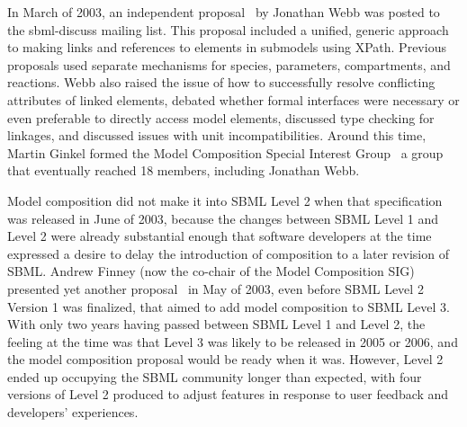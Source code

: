 In March of 2003, an independent proposal~\cite{} by Jonathan Webb was
posted to the sbml-discuss mailing list.  This proposal included a
unified, generic approach to making links and references to elements in
submodels using XPath.  Previous proposals used separate mechanisms for
species, parameters, compartments, and reactions.  Webb also raised the
issue of how to successfully resolve conflicting attributes of linked
elements, debated whether formal interfaces were necessary or even
preferable to directly access model elements, discussed type checking
for linkages, and discussed issues with unit incompatibilities.  Around
this time, Martin Ginkel formed the Model Composition Special Interest
Group~\cite{} a group that eventually reached 18 members, including
Jonathan Webb.

Model composition did not make it into SBML Level 2 when that
specification was released in June of 2003, because the changes between
SBML Level 1 and Level 2 were already substantial enough that software
developers at the time expressed a desire to delay the introduction of
composition to a later revision of SBML.  Andrew Finney (now the
co-chair of the Model Composition SIG) presented yet another
proposal~\cite{} in May of 2003, even before SBML Level 2 Version 1 was
finalized, that aimed to add model composition to SBML Level 3.  With
only two years having passed between SBML Level 1 and Level 2, the
feeling at the time was that Level 3 was likely to be released in 2005
or 2006, and the model composition proposal would be ready when it was.
However, Level 2 ended up occupying the SBML community longer than
expected, with four versions of Level 2 produced to adjust features in
response to user feedback and developers' experiences.

